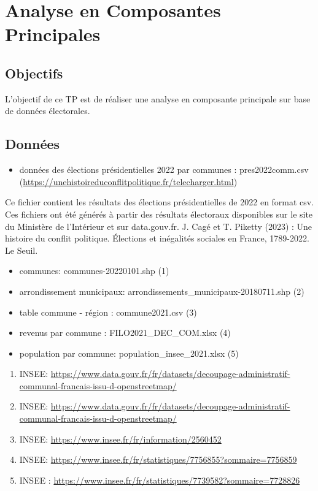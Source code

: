 \documentclass[
]{book}
\providecommand{\tightlist}{%
  \setlength{\itemsep}{0pt}\setlength{\parskip}{0pt}}
\begin{document}
\hypertarget{analyse-en-composantes-principales}{%
\chapter{Analyse en Composantes Principales}\label{analyse-en-composantes-principales}}

\hypertarget{objectifs}{%
\section{Objectifs}\label{objectifs}}

L'objectif de ce TP est de réaliser une analyse en composante principale sur base de données électorales.

\hypertarget{donnuxe9es}{%
\section{Données}\label{donnuxe9es}}

\begin{itemize}
\tightlist
\item
  données des élections présidentielles 2022 par communes : pres2022comm.csv (\url{https://unehistoireduconflitpolitique.fr/telecharger.html})
\end{itemize}

Ce fichier contient les résultats des élections présidentielles de 2022 en format csv. Ces fichiers ont été générés à partir des résultats électoraux disponibles sur le site du Ministère de l'Intérieur et sur data.gouv.fr. J. Cagé et T. Piketty (2023) : Une histoire du conflit politique. Élections et inégalités sociales en France, 1789-2022. Le Seuil.

\begin{itemize}
\item
  communes: communes-20220101.shp (1)
\item
  arrondissement municipaux: arrondissements\_municipaux-20180711.shp (2)
\item
  table commune - région : commune2021.csv (3)
\item
  revenus par commune : FILO2021\_DEC\_COM.xlsx (4)
\item
  population par commune: population\_insee\_2021.xlsx (5)
\end{itemize}

\begin{enumerate}
\def\labelenumi{(\arabic{enumi})}
\tightlist
\item
  INSEE: \url{https://www.data.gouv.fr/fr/datasets/decoupage-administratif-communal-francais-issu-d-openstreetmap/}
\item
  INSEE: \url{https://www.data.gouv.fr/fr/datasets/decoupage-administratif-communal-francais-issu-d-openstreetmap/}
\item
  INSEE: \url{https://www.insee.fr/fr/information/2560452}
\item
  INSEE: \url{https://www.insee.fr/fr/statistiques/7756855?sommaire=7756859}
\item
  INSEE : \url{https://www.insee.fr/fr/statistiques/7739582?sommaire=7728826}
\end{enumerate}
\end{document}
